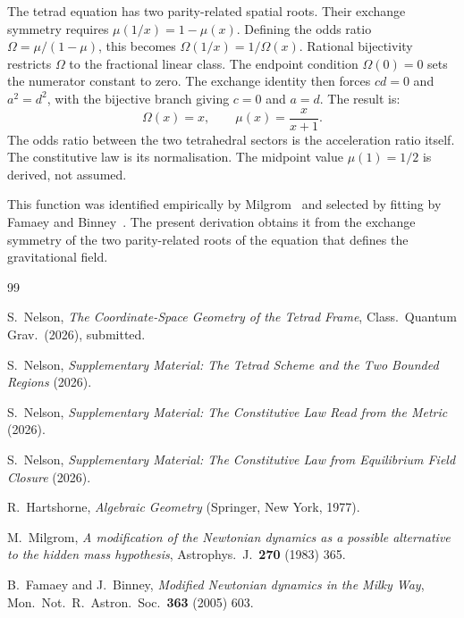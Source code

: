 \documentclass[twocolumn]{iopjournal}
\begin{document}
The tetrad equation has two parity-related spatial roots. Their
exchange symmetry requires $\mu(1/x) = 1 - \mu(x)$. Defining
the odds ratio $\Omega = \mu/(1-\mu)$, this becomes
$\Omega(1/x) = 1/\Omega(x)$. Rational bijectivity restricts
$\Omega$ to the fractional linear class. The endpoint condition
$\Omega(0) = 0$ sets the numerator constant to zero. The
exchange identity then forces $cd = 0$ and $a^2 = d^2$, with
the bijective branch giving $c = 0$ and $a = d$. The result is:
\begin{equation}
  \Omega(x) = x, \qquad \mu(x) = \frac{x}{x + 1}.
\end{equation}
The odds ratio between the two tetrahedral sectors is the
acceleration ratio itself. The constitutive law is its
normalisation. The midpoint value $\mu(1) = 1/2$ is derived,
not assumed.

This function was identified empirically by
Milgrom~\cite{Milgrom1983} and selected by fitting by
Famaey and Binney~\cite{FamaeyBinney2005}. The present
derivation obtains it from the exchange symmetry of the
two parity-related roots of the equation that defines the
gravitational field.


\begin{thebibliography}{99}

S.~Nelson,
\textit{The Coordinate-Space Geometry of the Tetrad Frame},
Class.\ Quantum Grav.\ (2026), submitted.

S.~Nelson,
\textit{Supplementary Material: The Tetrad Scheme and the Two
Bounded Regions} (2026).

S.~Nelson,
\textit{Supplementary Material: The Constitutive Law Read from
the Metric} (2026).

S.~Nelson,
\textit{Supplementary Material: The Constitutive Law from
Equilibrium Field Closure} (2026).

R.~Hartshorne,
\textit{Algebraic Geometry}
(Springer, New York, 1977).

M.~Milgrom,
\textit{A modification of the Newtonian dynamics as a possible
alternative to the hidden mass hypothesis},
Astrophys.\ J.\ \textbf{270} (1983) 365.

B.~Famaey and J.~Binney,
\textit{Modified Newtonian dynamics in the Milky Way},
Mon.\ Not.\ R.\ Astron.\ Soc.\ \textbf{363} (2005) 603.

\end{thebibliography}
\end{document}
